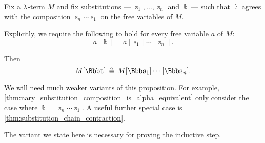 \begin{proposition}\label{thm:nary_substitution_composition_match_is_alpha_equivalent}
  Fix a \( {\mathrm \lambda} \)-term \( M \) and fix \hyperref[def:lambda_term_substitution]{substitutions} --- \( \Bbbs_1, \ldots, \Bbbs_n \) and \( \Bbbt \) --- such that \( \Bbbt \) agrees with the \hyperref[def:lambda_substitution_composition]{composition} \( \Bbbs_n \cdots \Bbbs_1 \) on the free variables of \( M \).

  Explicitly, we require the following to hold for every free variable \( a \) of \( M \):
  \begin{equation*}
    a[\Bbbt] = a[\Bbbs_1] \cdots [\Bbbs_n].
  \end{equation*}

  Then
  \begin{equation}\label{eq:thm:nary_substitution_composition_match_is_alpha_equivalent}
    M[\Bbbt] \aequiv M[\Bbbs_1] \cdots [\Bbbs_n].
  \end{equation}
\end{proposition}
\begin{comments}
  \item We will need much weaker variants of this proposition. For example, \cref{thm:nary_substitution_composition_is_alpha_equivalent} only consider the case where \( \Bbbt = \Bbbs_n \cdots \Bbbs_1 \). A useful further special case is \cref{thm:substitution_chain_contraction}.

  The variant we state here is necessary for proving the inductive step.
\end{comments}
